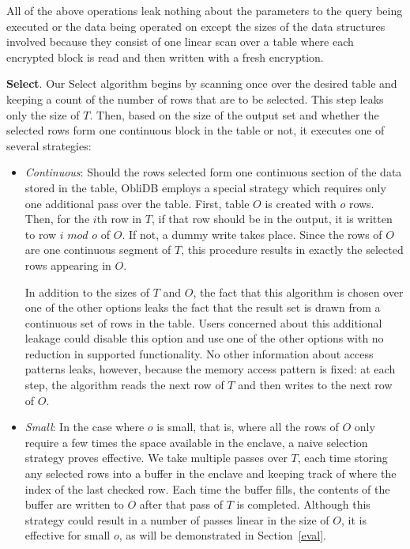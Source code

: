 \documentclass[letterpaper,twocolumn,10pt]{article}
\def\name/{ObliDB}
\begin{document}
All of the above operations leak nothing about the parameters to the query being executed or the data being operated on except the sizes of the data structures involved because they consist of one linear scan over a table where each encrypted block is read and then written with a fresh encryption. 

  \noindent \textbf{Select}. 
Our Select algorithm begins by scanning once over the desired table and keeping a count of the number of rows that are to be selected. This step leaks only the size of $T$. Then, based on the size of the output set and whether the selected rows form one continuous block in the table or not, it executes one of several strategies:
\begin{itemize}[itemsep=0pt,parsep=0pt]
\item \textit{Continuous}: Should the rows selected form one continuous section of the data stored in the table, \name/ employs a special strategy which requires only one additional pass over the table. First, table $O$ is created with $o$ rows. Then, for the $i$th row in $T$, if that row should be in the output, it is written to row $i\textit{ mod }o$ of $O$. If not, a dummy write takes place. Since the rows of $O$ are one continuous segment of $T$, this procedure results in exactly the selected rows appearing in $O$. 

In addition to the sizes of $T$ and $O$, the fact that this algorithm is chosen over one of the other options leaks the fact that the result set is drawn from a continuous set of rows in the table. Users concerned about this additional leakage could disable this option and use one of the other options with no reduction in supported functionality. No other information about access patterns leaks, however, because the memory access pattern is fixed: at each step, the algorithm reads the next row of $T$ and then writes to the next row of $O$. 

\item \textit{Small}: In the case where $o$ is small, that is, where all the rows of $O$ only require a few times the space available in the enclave, a naive selection strategy proves effective. We take multiple passes over $T$, each time storing any selected rows into a buffer in the enclave and keeping track of where the index of the last checked row. Each time the buffer fills, the contents of the buffer are written to $O$ after that pass of $T$ is completed. Although this strategy could result in a number of passes linear in the size of $O$, it is effective for small $o$, as will be demonstrated in Section~\ref{eval}.


\end{itemize}
\end{document}
